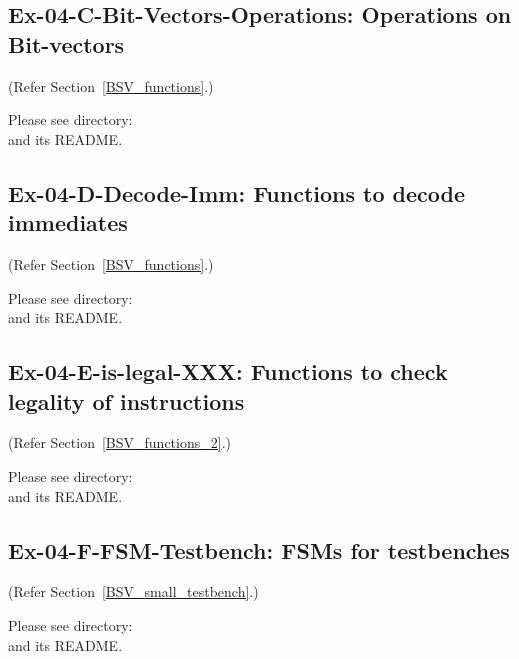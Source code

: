 
\subsection*{Ex-04-C-Bit-Vectors-Operations: Operations on Bit-vectors}
\label{Ex-04-C-Bit-Vectors-Operations}

(Refer Section~\ref{BSV_functions}.)

Please see directory:  \\
and its README.


\subsection*{Ex-04-D-Decode-Imm: Functions to decode immediates}
\label{Ex-04-D-Decode-Imm}

(Refer Section~\ref{BSV_functions}.)

Please see directory:  \\
and its README.


\subsection*{Ex-04-E-is-legal-XXX: Functions to check legality of instructions}
\label{Ex-04-E-is-legal-XXX}

(Refer Section~\ref{BSV_functions_2}.)

Please see directory:  \\
and its README.


\subsection*{Ex-04-F-FSM-Testbench: FSMs for testbenches}
\label{Ex-04-F-FSM-Testbench}

(Refer Section~\ref{BSV_small_testbench}.)

Please see directory: 
\\ and its README.


